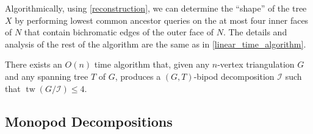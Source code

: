 \documentclass{patmorin}
\DeclareMathOperator{\tw}{tw}
\begin{document}
Algorithmically, using \cref{reconstruction}, we can determine the ``shape'' of the tree $X$ by performing lowest common ancestor queries on the at most four inner faces of $N$ that contain bichromatic edges of the outer face of $N$.  The details and analysis of the rest of the algorithm are the same as in \cref{linear_time_algorithm}.



%
%
%
%

\begin{thm}
  There exists an $O(n)$ time algorithm that, given any $n$-vertex triangulation $G$ and any spanning tree $T$ of $G$, produces a $(G,T)$-bipod decomposition $\mathcal{I}$ such that $\tw(G/\mathcal{I})\le 4$.
\end{thm}


\subsection{Monopod Decompositions}
\end{document}
